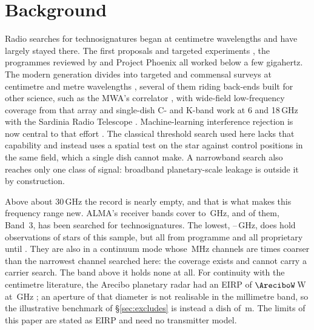 \section{Background}
\label{sec:background}

Radio searches for technosignatures began at centimetre wavelengths and
have largely stayed there. The first proposals and targeted experiments
\citep{CocconiMorrison1959,Drake1960}, the programmes reviewed by
\citet{Tarter2001} and Project Phoenix \citep{Backus2002} all worked
below a few gigahertz. The modern generation divides into targeted and
commensal surveys at centimetre and metre wavelengths
\citep{Zhang2020,Czech2021,FAST3IATLAS2025,LOFARdualsite2023,Choza2024},
several of them riding back-ends built for other science, such as the MWA's
correlator \citep{Morrison2023}, with wide-field low-frequency coverage from
that array \citep{Tremblay2024}
and single-dish C- and K-band work at 6 and 18\,GHz with the Sardinia
Radio Telescope \citep{SRT2025}. Machine-learning interference rejection
is now central to that effort
\citep{Ma2023,GLOBULAR2025,AnomalyParkesGBT2025}. The classical threshold
search used here lacks that capability and instead uses a spatial test on
the star against control positions in the same field, which a single dish
cannot make. A narrowband search also reaches only one class of signal:
broadband planetary-scale leakage \citep{BRaTs2026} is outside it by
construction.

Above about 30\,GHz the record is nearly empty, and that is what makes
this frequency range new. ALMA's \SbNBand{} receiver bands cover
\SbBandLoGHz{} to \SbBandHiGHz\,GHz, and \SbNPriorBandWord{} of them, Band~3,
has been searched for technosignatures. The lowest, \SbBandOneLoGHz--\SbBandOneHiGHz\,GHz, does hold observations
of \SbBoneNStar{} stars of this sample, but all from \SbBoneNProgWord{}
programme and all proprietary until \SbBoneRelYear. They are also in a
continuum mode whose \SbBoneChanMHz\,MHz channels are \SbBoneChanRatio{}
times coarser than the narrowest channel searched here: the coverage exists
and cannot carry a carrier search. The band above it holds none at all. For continuity with
the centimetre literature, the Arecibo planetary radar had an EIRP of
$\AreciboW$\,W at \ArecGHz\,GHz \citep{EarthDetectingEarth2025}; an
aperture of that diameter is not realisable in the millimetre band, so the
illustrative benchmark of \S\ref{sec:excludes} is instead a dish of
\BenchDiam\,m. The limits of this paper are stated as EIRP and need no
transmitter model.

